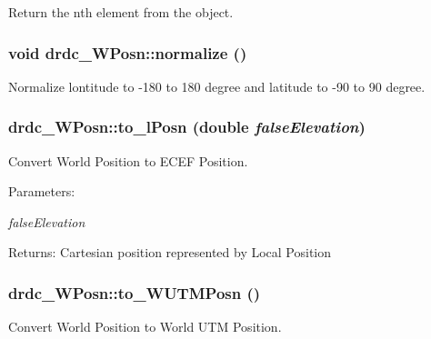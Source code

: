 Return the nth element from the object. 

\hypertarget{classdrdc__WPosn_1ee5a6abd458cb83f456abfe72eb0d66}{
\subsubsection[normalize]{\setlength{\rightskip}{0pt plus 5cm}void drdc\_\-WPosn::normalize ()}}
\label{classdrdc__WPosn_1ee5a6abd458cb83f456abfe72eb0d66}


Normalize lontitude to -180 to 180 degree and latitude to -90 to 90 degree. 

\hypertarget{classdrdc__WPosn_d277ac3e0f3a88e72d59297c0e2fcc46}{
\subsubsection[to\_\-lPosn]{ drdc\_\-WPosn::to\_\-lPosn (double {\em falseElevation})}}
\label{classdrdc__WPosn_d277ac3e0f3a88e72d59297c0e2fcc46}


Convert World Position to ECEF Position. 

\begin{Desc}
\item[Parameters:]
\begin{description}
\item[{\em falseElevation}]\end{description}
\end{Desc}
\begin{Desc}
\item[Returns:]Cartesian position represented by Local Position \end{Desc}
\hypertarget{classdrdc__WPosn_a12b36984bf6e77147cdbe1fd17c9bcd}{
\subsubsection[to\_\-WUTMPosn]{ drdc\_\-WPosn::to\_\-WUTMPosn ()}}
\label{classdrdc__WPosn_a12b36984bf6e77147cdbe1fd17c9bcd}


Convert World Position to World UTM Position. 

